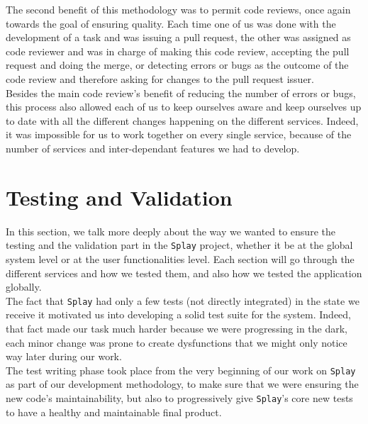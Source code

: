 \documentclass{eplmastersthesis}
\begin{document}
          The second benefit of this methodology was to
          permit code reviews, once again towards the goal of ensuring quality.
          Each time one of us was done with the development of a
          task and was issuing a pull request, the other was assigned as code
          reviewer and was in charge of making this code review, accepting the
          pull request and doing the merge, or detecting errors or bugs as the
          outcome of the code review and therefore asking for changes to the
          pull request issuer.\\

          Besides the main code review's benefit of reducing the number of
          errors or bugs, this process also allowed each of us to keep ourselves
          aware and keep ourselves up to date with all the different changes
          happening on the different services. Indeed, it was impossible for
          us to work together on every single service, because
          of the number of services and inter-dependant features we had to
          develop.

    \section{Testing and Validation}

      In this section, we talk more deeply about the way we wanted to ensure
      the testing and the validation part in the \texttt{Splay} project, whether it be
      at the global system level or at the user functionalities level. Each
      section will go through the different services and how we tested them, and
      also how we tested the application globally.\\

      The fact that \texttt{Splay} had only a few tests (not directly integrated) in the state we receive it
      motivated us into developing a solid test suite for the system.
      Indeed, that fact made our task much harder because we were progressing
      in the dark, each minor change was prone to create dysfunctions that we
      might only notice way later during our work.\\

      The test writing phase took place from the very beginning of our work on
      \texttt{Splay} as part of our development methodology,
      to make sure that we were ensuring the new code's maintainability, but
      also to progressively give \texttt{Splay}'s core new tests to have a healthy
      and maintainable final product.\\
\end{document}
